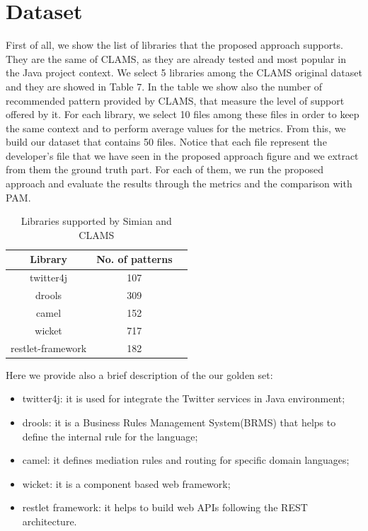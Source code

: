 \section{Dataset}
First of all, we show the list of libraries that the proposed approach supports. They are the same of CLAMS, as they are already tested and most popular in the Java project context. We select 5 libraries among the CLAMS original dataset and they are showed in Table 7. In the table we show also the number of recommended pattern provided by CLAMS, that measure the level of support offered by it. For each library, we select 10 files among these files in order to keep the same context and to perform average values for the metrics. From this, we build our dataset that contains 50 files. Notice that each file represent the developer's file that we have seen in the proposed approach figure and we extract from them the ground truth part. For each of them, we run the proposed approach and evaluate the results through the metrics and the comparison with PAM.
\begin{table}[!h]
  \caption{ Libraries supported by Simian and CLAMS }
  \label{Table:7}
 \begin{center}

\begin{tabular}{|c|c|c|}

\hline
 \textbf{Library} & \textbf{No. of patterns}  \\
\hline
 twitter4j &  107   \\
\hline
drools & 309 \\
\hline
camel & 152  \\
\hline 
wicket & 717  \\
\hline
restlet-framework & 182  \\
\hline
\end{tabular}
\end{center}
\end{table} 
Here we provide also a brief description of the our golden set:
\begin{itemize}
\item twitter4j: it is used for integrate the Twitter services in Java environment;
\item drools: it is a Business Rules Management System(BRMS) that helps to define the internal rule for the language;
\item camel: it defines mediation rules and routing for specific domain languages;
\item wicket: it is a component based web framework;
\item restlet framework: it helps to build web APIs following the REST architecture. 
\end{itemize}




